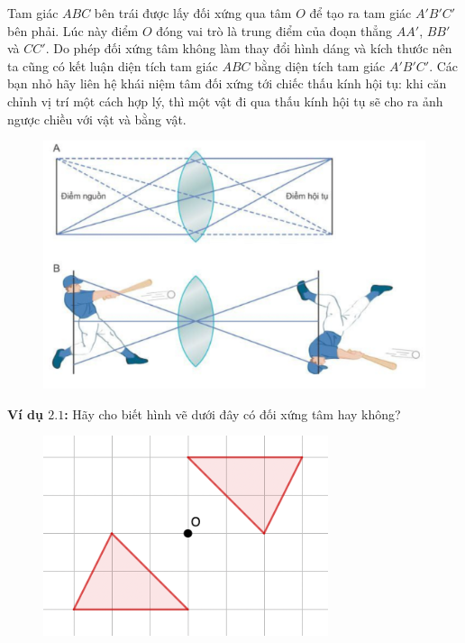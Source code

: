 \begin{multicols}{2}
	Tam giác $ABC$ bên trái được lấy đối xứng qua tâm $O$ để tạo ra tam giác $A'B'C'$ bên phải. Lúc này điểm $O$ đóng vai trò là trung điểm của đoạn thẳng $AA'$, $BB'$ và $CC'$. Do phép đối xứng tâm không làm thay đổi hình dáng và kích thước nên ta cũng có kết luận diện tích tam giác $ABC$ bằng diện tích tam giác $A'B'C'$. Các bạn nhỏ hãy liên hệ khái niệm tâm đối xứng tới chiếc thấu kính hội tụ: khi căn chỉnh vị trí một cách hợp lý, thì một vật đi qua thấu kính hội tụ sẽ cho ra ảnh ngược chiều với vật và bằng vật.
	\begin{figure}[H]
		\vspace*{-5pt}
		\centering
		\captionsetup{labelformat= empty, justification=centering}
		\includegraphics[width= 1\linewidth]{Picture10}
		\vspace*{-15pt}
	\end{figure}
	\textbf{\color{toancuabi}Ví dụ $\pmb{2.1}$:} Hãy cho biết hình vẽ dưới đây có đối xứng tâm hay không? 
	\begin{figure}[H]
		\vspace*{5pt}
		\centering
		\captionsetup{labelformat= empty, justification=centering}
		\includegraphics[width= 0.7\linewidth]{Picture11}

\end{figure}
\end{multicols}
